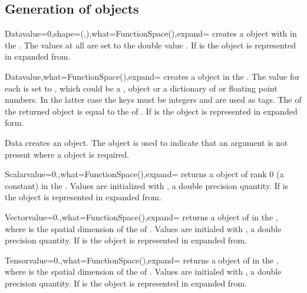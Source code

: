 \subsection{Generation of \Data objects}
\begin{classdesc}{Data}{value=0,shape=(,),what=FunctionSpace(),expand=\False}
creates a \Data object with \Shape {} in the \FunctionSpace {}.
The values at all \DataSamplePoints are set to the double value . If  is \True
the \Data object is represented in expanded from.
\end{classdesc}

\begin{classdesc}{Data}{value,what=FunctionSpace(),expand=\False}
creates a \Data object in the \FunctionSpace {}. 
The value for each \DataSamplePoints is set to , which could be a \numpy, \Data object  or a dictionary of 
\numpy or floating point numbers. In the latter case the keys must be integers and are used
as tags.
The \Shape of the returned object is equal to the \Shape of . If  is \True
the \Data object is represented in expanded form.
\end{classdesc}

\begin{classdesc}{Data}{}
creates an \EmptyData object. The \EmptyData object is used to indicate that an argument is not present
where a \Data object is required.
\end{classdesc}

\begin{funcdesc}{Scalar}{value=0.,what=FunctionSpace(),expand=\False}
returns a \Data object of rank 0 (a constant) in the \FunctionSpace {}.
Values are initialized with , a double precision quantity. If  is \True
the \Data object is represented in expanded from.
\end{funcdesc}

\begin{funcdesc}{Vector}{value=0.,what=FunctionSpace(),expand=\False}
returns a \Data object of \Shape {} in the \FunctionSpace {},
where  is the spatial dimension of the \Domain of .
Values are initialed with , a double precision quantity. If  is \True
the \Data object is represented in expanded from.
\end{funcdesc}

\begin{funcdesc}{Tensor}{value=0.,what=FunctionSpace(),expand=\False}
returns a \Data object of \Shape {} in the \FunctionSpace {},
where  is the spatial dimension of the \Domain of .
Values are initialed with , a double precision quantity. If  is \True
the \Data object is represented in expanded from.
\end{funcdesc}

